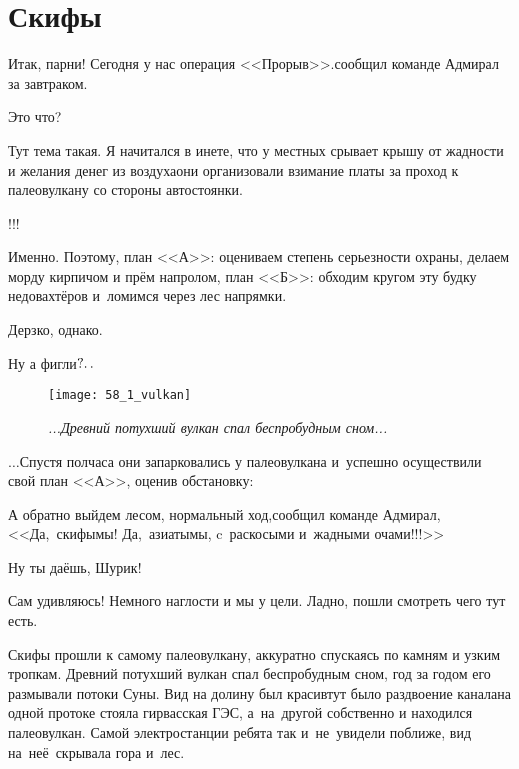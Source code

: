 \chapter{Скифы}
\vepsianrose

\diagdash Итак, парни! Сегодня у нас операция <<Прорыв>>.\mdash сообщил команде Адмирал за завтраком.

\diagdash Это что?

\diagdash Тут тема такая. Я начитался в инете, что у местных срывает крышу от жадности и желания денег из воздуха\mdash они организовали взимание платы за проход к палеовулкану со стороны автостоянки.

\diagdash !!!

\diagdash Именно. Поэтому, план <<А>>: оцениваем степень серьезности охраны, делаем морду кирпичом и прём напролом, план <<Б>>: обходим кругом эту будку недовахтёров и~ломимся через лес напрямки.

\diagdash Дерзко, однако.

\diagdash Ну а фигли$\mathpunct{?\ldotp\ldotp}$ %

\newpage

\begin{figure}[h]
	\centering
	\texttt{[image: 58\_1\_vulkan]}
	\caption{\small\textit{...Древний потухший вулкан спал беспробудным сном...}}
\end{figure}

$\ldots$Спустя полчаса они запарковались у палеовулкана и~успешно осуществили свой план <<А>>, оценив обстановку:

\diagdash А обратно выйдем лесом, нормальный ход,\mdash сообщил команде Адмирал,\mdash <<Да,~скифы\mdash мы! Да,~азиаты\mdash мы, c~раскосыми и~жадными очами!!!>>

\diagdash Ну ты даёшь, Шурик!

\diagdash Сам удивляюсь! Немного наглости и мы у цели. Ладно, пошли смотреть чего тут есть.

Скифы прошли к самому палеовулкану, аккуратно спускаясь по камням и узким тропкам. Древний потухший вулкан спал беспробудным сном, год за годом его размывали потоки Суны. Вид на долину был красив\mdash тут было раздвоение канала\mdash на одной протоке стояла гирвасская ГЭС, а~на~другой собственно и находился палеовулкан. Самой электростанции ребята так и~не~увидели поближе, вид на~неё~скрывала гора и~лес. 

